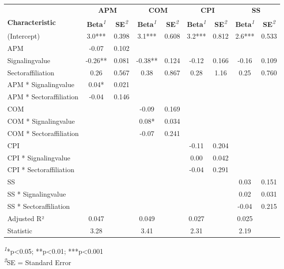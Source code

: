 \setlength{\LTpost}{0mm}
\begin{longtable}{lcccccccc}
\toprule
 & \multicolumn{2}{c}{\textbf{APM}} & \multicolumn{2}{c}{\textbf{COM}} & \multicolumn{2}{c}{\textbf{CPI}} & \multicolumn{2}{c}{\textbf{SS}} \\ 
\cmidrule(lr){2-3} \cmidrule(lr){4-5} \cmidrule(lr){6-7} \cmidrule(lr){8-9}
\textbf{Characteristic} & \textbf{Beta}\textsuperscript{\textit{1}} & \textbf{SE}\textsuperscript{\textit{2}} & \textbf{Beta}\textsuperscript{\textit{1}} & \textbf{SE}\textsuperscript{\textit{2}} & \textbf{Beta}\textsuperscript{\textit{1}} & \textbf{SE}\textsuperscript{\textit{2}} & \textbf{Beta}\textsuperscript{\textit{1}} & \textbf{SE}\textsuperscript{\textit{2}} \\ 
\midrule\addlinespace[2.5pt]
(Intercept) & 3.0*** & 0.398 & 3.1*** & 0.608 & 3.2*** & 0.812 & 2.6*** & 0.533 \\ 
APM & -0.07 & 0.102 &  &  &  &  &  &  \\ 
Signalingvalue & -0.26** & 0.081 & -0.38** & 0.124 & -0.12 & 0.166 & -0.16 & 0.109 \\ 
Sectoraffiliation & 0.26 & 0.567 & 0.38 & 0.867 & 0.28 & 1.16 & 0.25 & 0.760 \\ 
APM * Signalingvalue & 0.04* & 0.021 &  &  &  &  &  &  \\ 
APM * Sectoraffiliation & -0.04 & 0.146 &  &  &  &  &  &  \\ 
COM &  &  & -0.09 & 0.169 &  &  &  &  \\ 
COM * Signalingvalue &  &  & 0.08* & 0.034 &  &  &  &  \\ 
COM * Sectoraffiliation &  &  & -0.07 & 0.241 &  &  &  &  \\ 
CPI &  &  &  &  & -0.11 & 0.204 &  &  \\ 
CPI * Signalingvalue &  &  &  &  & 0.00 & 0.042 &  &  \\ 
CPI * Sectoraffiliation &  &  &  &  & -0.04 & 0.291 &  &  \\ 
SS &  &  &  &  &  &  & 0.03 & 0.151 \\ 
SS * Signalingvalue &  &  &  &  &  &  & 0.02 & 0.031 \\ 
SS * Sectoraffiliation &  &  &  &  &  &  & -0.04 & 0.215 \\ 
Adjusted R² & 0.047 &  & 0.049 &  & 0.027 &  & 0.025 &  \\ 
Statistic & 3.28 &  & 3.41 &  & 2.31 &  & 2.19 &  \\ 
\bottomrule
\end{longtable}
\begin{minipage}{\linewidth}
\textsuperscript{\textit{1}}*p\textless{}0.05; **p\textless{}0.01; ***p\textless{}0.001\\
\textsuperscript{\textit{2}}SE = Standard Error\\
\end{minipage}

